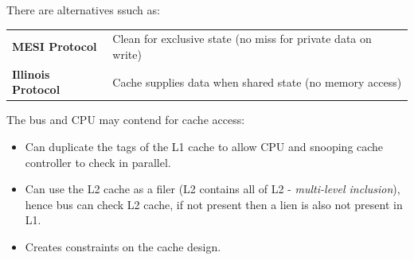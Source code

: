 There are alternatives ssuch as:
\begin{center}
    \begin{tabular}{l p{}}
        \textbf{MESI Protocol} & Clean for exclusive state (no miss for private data on write) \\
        \textbf{Illinois Protocol} & Cache supplies data when shared state (no memory access) \\
    \end{tabular}
\end{center}
The bus and CPU may contend for cache access:
\begin{itemize}
    \item Can duplicate the tags of the L1 cache to allow CPU and snooping cache controller to check in parallel.
    \item Can use the L2 cache as a filer (L2 contains all of L2 - \textit{multi-level inclusion}), hence bus can check L2 cache, if not present then a lien is also not present in L1.
    \item Creates constraints on the cache design.
\end{itemize}
